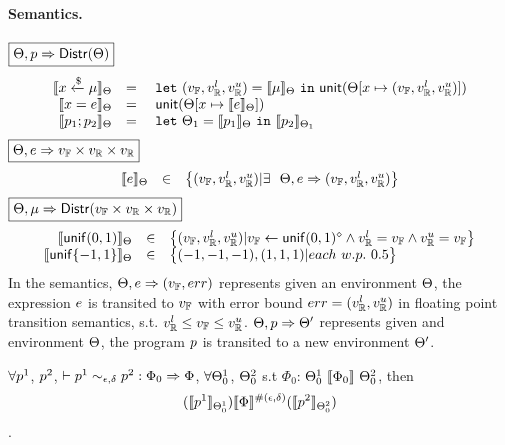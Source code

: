 \documentclass[a4paper,11pt]{article}
\begin{document}
\paragraph{Semantics.}
$\boxed{\Theta, p \Rightarrow \mathsf{Distr}(\Theta)}$
\[
	\begin{array}{rcl}
	\llbracket x \xleftarrow{\$} \mu \rrbracket_{\Theta}
	& = & 
	~\mathtt{let}~ (v_{\mathbb{F}}, v_{\mathbb{R}}^{l}, v_{\mathbb{R}}^{u}) = \llbracket \mu \rrbracket_{\Theta} 
	~\mathtt{in}~ 
	\mathsf{unit}(\Theta[x \mapsto (v_{\mathbb{F}}, v_{\mathbb{R}}^{l}, v_{\mathbb{R}}^{u})])
	\\
	\llbracket x = e \rrbracket_{\Theta}
	& = &  
	~\mathsf{unit}(\Theta[x \mapsto \llbracket e \rrbracket_{\Theta}])
	\\
	\llbracket p_1; p_2 \rrbracket_{\Theta}
	& = &  ~\mathtt{let}~  \Theta_1 = 
	\llbracket p_1 \rrbracket_{\Theta} ~\mathtt{in}~
	\llbracket p_2 \rrbracket_{\Theta_1} 
	\end{array}
\]
$\boxed{\Theta, e \Rightarrow v_{\mathbb{F}} \times v_{\mathbb{R}} \times v_{\mathbb{R}}}$
\[
	\begin{array}{rcl}
	\llbracket e \rrbracket_{\Theta}
	& \in &  
	\big\{(v_{\mathbb{F}}, v_{\mathbb{R}}^{l}, v_{\mathbb{R}}^{u}) |
	\exists ~~  
	\Theta,  
	e \Rightarrow (v_{\mathbb{F}}, v_{\mathbb{R}}^{l}, v_{\mathbb{R}}^{u})\big\}
	\end{array}
\]
$
\boxed{\Theta, \mu \Rightarrow \mathsf{Distr}(v_{\mathbb{F}} \times v_{\mathbb{R}} \times v_{\mathbb{R}})}
$
\[
	\begin{array}{rcl}
	\llbracket \mathsf{unif}(0, 1) \rrbracket_{\Theta}
	& \in & 
	\big\{
	(v_{\mathbb{F}}, v_{\mathbb{R}}^{l}, v_{\mathbb{R}}^{u}) |
	v_{\mathbb{F}} \leftarrow \mathsf{unif}(0, 1)^{\diamond}
	\land v_{\mathbb{R}}^{l} = v_{\mathbb{F}}
	\land v_{\mathbb{R}}^{u} = v_{\mathbb{F}}
	\big\}\\
	\llbracket \mathsf{unif}\{-1, 1\} \rrbracket_{\Theta}
	& \in & 
	\big\{
	(-1, -1, -1), (1, 1, 1) |
	each ~ w.p. ~ 0.5 
	\big\}\\	
	\end{array}
\]
In the semantics, 
$\Theta, e \Rightarrow (v_{\mathbb{F}}, err)$ represents given an environment $\Theta$, the expression $e$
is transited to $v_{\mathbb{F}}$ with error bound $err = (v_{\mathbb{R}}^{l}, v_{\mathbb{R}}^{u})$ in floating point transition semantics, s.t. $v_{\mathbb{R}}^{l} \leq v_{\mathbb{F}} \leq v_{\mathbb{R}}^{u}$. 
$\Theta, p \Rightarrow \Theta'$ represents given and environment $\Theta$, the program $p$ is transited to a new environment $\Theta'$.


\clearpage
\begin{thm}[Soundness]
 $\forall p^1$, $p^2$,  $ \vdash p^1	
\sim_{\epsilon, \delta} 
p^2 :
\Phi_0 \Rightarrow \Phi $,    $\forall \Theta^1_0$, $\Theta^2_0$ 
s.t $\Phi_0$: 
$\Theta^1_0 ~ \llbracket \Phi_0 \rrbracket ~ \Theta^2_0$,
then
$$ 
(\llbracket p^1 \rrbracket_{\Theta^1_0})  
\llbracket \Phi \rrbracket^{\#(\epsilon, \delta)} 
(\llbracket p^2 \rrbracket_{\Theta^2_0}) 
$$.
\end{thm}
\end{document}
